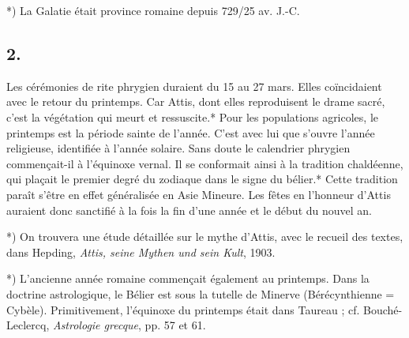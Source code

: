 \documentclass[a4paper, 11pt, oneside, polutonikogreek, french]{article}
\begin{document}
*) La Galatie était province romaine depuis 729/25 av. J.-C.

\subsection{2.}

Les cérémonies de rite phrygien duraient du 15 au 27 mars. Elles coïncidaient avec le retour du printemps. Car Attis, dont elles reproduisent le drame sacré, c'est la végétation qui meurt et ressuscite.* Pour les populations agricoles, le printemps est la période sainte de l'année. C'est avec lui que s'ouvre l'année religieuse, identifiée à l'année solaire. Sans doute le calendrier phrygien commençait-il à l'équinoxe vernal. Il se conformait ainsi à la tradition chaldéenne, qui plaçait le premier degré du zodiaque dans le signe du bélier.* Cette tradition paraît s'être en effet généralisée en Asie Mineure. Les fêtes en l'honneur d'Attis auraient donc sanctifié à la fois la fin d'une année et le début du nouvel an.

*) On trouvera une étude détaillée sur le mythe d'Attis, avec le recueil des textes, dans Hepding, \emph{Attis, seine Mythen und sein Kult}, 1903.

*) L'ancienne année romaine commençait également au printemps. Dans la doctrine astrologique, le Bélier est sous la tutelle de Minerve (Bérécynthienne = Cybèle). Primitivement, l'équinoxe du printemps était dans Taureau ; cf. Bouché-Leclercq, \emph{Astrologie grecque}, pp. 57 et 61.
\end{document}
